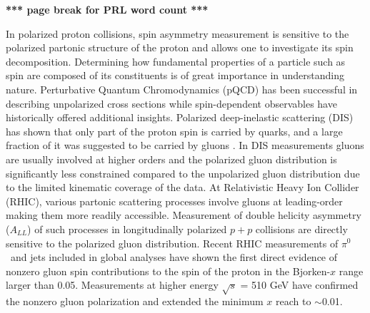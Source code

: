 \documentclass[twocolumn,letterpaper,aps,prl,longbibliography,superscriptaddress,floatfix]{revtex4-2}
\newcommand{\pizero}{\ensuremath{\pi^0}}
\newcommand{\ALL}{\ensuremath{A_{LL}}}
\begin{document}

\textbf{*** page break for PRL word count ***}  \clearpage

In polarized proton collisions, spin asymmetry measurement is sensitive to the polarized partonic structure of the proton and allows one to investigate its spin decomposition. Determining how fundamental properties of a particle such as spin are composed of its constituents is of great importance in understanding nature. Perturbative Quantum Chromodynamics (pQCD) has been successful in describing unpolarized cross sections while spin-dependent observables have historically offered additional insights. Polarized deep-inelastic scattering (DIS) has shown that only part of the proton spin is carried by quarks, and a large fraction of it was suggested to be carried by gluons \cite{1988364, PhysRevD.58.112001, ALEXAKHIN20078}. In DIS measurements gluons are usually involved at higher orders and the polarized gluon distribution is significantly less constrained compared to the unpolarized gluon distribution due to the limited kinematic coverage of the data. At Relativistic Heavy Ion Collider (RHIC), various partonic scattering processes involve gluons at leading-order making them more readily accessible. Measurement of double helicity asymmetry (\ALL) of such processes in longitudinally polarized $p+p$ collisions are directly sensitive to the polarized gluon distribution. Recent RHIC measurements of \pizero\ and jets \cite{PhysRevD.90.012007, PhysRevLett.103.012003, PhysRevD.79.012003, PhysRevD.86.032006, PhysRevLett.115.092002} included in global analyses have shown the first direct evidence of nonzero gluon spin contributions to the spin of the proton \cite{PhysRevLett.113.012001, 2014276} in the Bjorken-$x$ range larger than 0.05. Measurements at higher energy $\sqrt{s}$ = 510 GeV \cite{PhysRevD.93.011501, PhysRevD.100.052005} have confirmed the nonzero gluon polarization and extended the minimum $x$ reach to $\sim$0.01.
\end{document}
